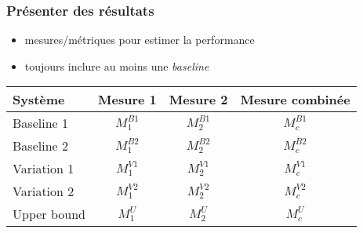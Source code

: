 \begin{frame}
\frametitle{Présenter des résultats}

\begin{itemize} \itemsep0.8em
    \item mesures/métriques pour estimer la performance
    \item toujours inclure au moins une \textit{baseline}
\end{itemize}

\vspace*{1em}

\small
\begin{tabular}{ l c c c }
\hline
    \textbf{Système} &
    \textbf{Mesure 1} & 
    \textbf{Mesure 2} & 
    \textbf{Mesure combinée} \\
\hline
    Baseline 1 & $M_1^{B1}$ & $M_2^{B1}$ & $M_c^{B1}$ \\
    Baseline 2 & $M_1^{B2}$ & $M_2^{B2}$ & $M_c^{B2}$ \\
    Variation 1 & $M_1^{V1}$ & $M_2^{V1}$ & $M_c^{V1}$ \\
    Variation 2 & $M_1^{V2}$ & $M_2^{V2}$ & $M_c^{V2}$ \\
    Upper bound & $M_1^U$ & $M_2^U$ & $M_c^U$ \\
\hline
\end{tabular}


\end{frame}

